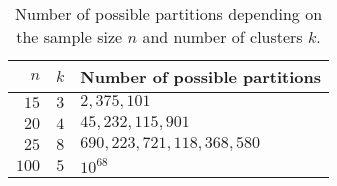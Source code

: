 
\begin{center}
\begin{longtable}{rrl}
\caption{Number of possible partitions depending on the sample size $n$ and
number of clusters $k$. \label{CA:perm}} \\
$n$   & $k$ & Number of possible partitions \\ \hline
$15$  & $3$ & $2,375,101$  \\ 
$20$  & $4$ & $45,232,115,901$  \\ 
$25$  & $8$ & $690,223,721,118,368,580$  \\ 
$100$ & $5$ & $10^{68}$ \\ 
\end{longtable}
\end{center}
